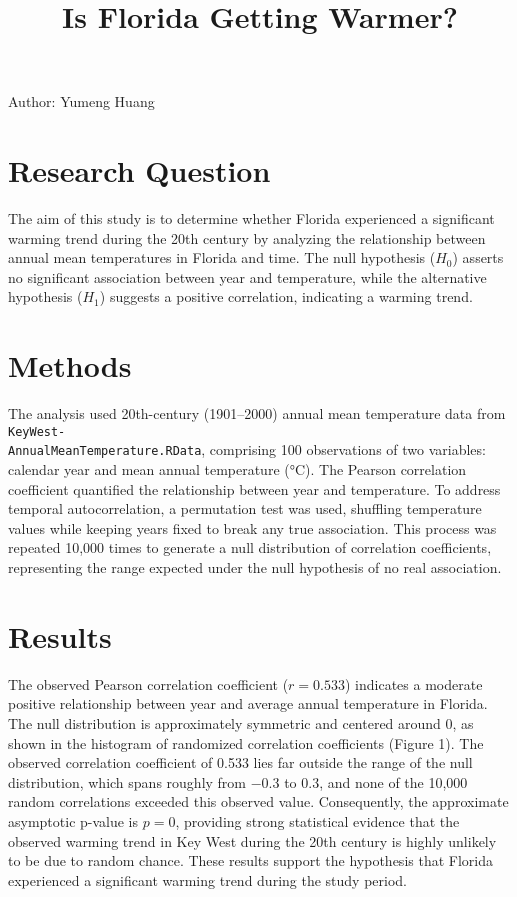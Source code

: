 \documentclass[12pt]{article}
\begin{document}
\title{\vspace{-3cm}\bfseries\Large Is Florida Getting Warmer?}
\date{} 
\maketitle


\vspace{-3cm} 
\begin{center}
    \small Author: Yumeng Huang \\ 
\end{center}

\vspace{-0.6cm} 

\section*{Research Question}
\normalsize The aim of this study is to determine whether Florida experienced a significant warming trend during the 20th century by analyzing the relationship between annual mean temperatures in Florida and time. The null hypothesis ($H_0$) asserts no significant association between year and temperature, while the alternative hypothesis ($H_1$) suggests a positive correlation, indicating a warming trend.\section*{Methods}

\normalsize The analysis used 20th-century (1901–2000) annual mean temperature data from \texttt{KeyWest-\\AnnualMeanTemperature.\allowbreak RData}, comprising 100 observations of two variables: calendar year and mean annual temperature (°C). The Pearson correlation coefficient quantified the relationship between year and temperature. To address temporal autocorrelation, a permutation test was used, shuffling temperature values while keeping years fixed to break any true association. This process was repeated 10,000 times to generate a null distribution of correlation coefficients, representing the range expected under the null hypothesis of no real association.

\section*{Results}
\normalsize The observed Pearson correlation coefficient ($r=0.533$) indicates a moderate positive relationship between year and average annual temperature in Florida. The null distribution is approximately symmetric and centered around 0, as shown in the histogram of randomized correlation coefficients (Figure 1). The observed correlation coefficient of 0.533 lies far outside the range of the null distribution, which spans roughly from $-0.3$ to $0.3$, and none of the 10,000 random correlations exceeded this observed value. Consequently, the approximate asymptotic p-value is $p=0$, providing strong statistical evidence that the observed warming trend in Key West during the 20th century is highly unlikely to be due to random chance. These results support the hypothesis that Florida experienced a significant warming trend during the study period.
\end{document}
